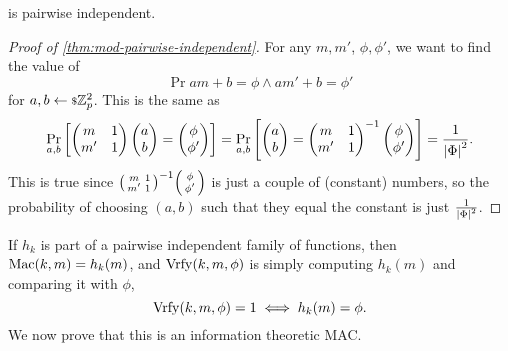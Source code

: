 \begin{theorem} \label{thm:mod-pairwise-independent}
	 is pairwise independent.
\end{theorem}

\begin{proof}[Proof of \cref{thm:mod-pairwise-independent}]
	For any $m, m'$, $\phi, \phi'$, we want to find the value of
	\begin{equation*}
		\Pr{a m + b = \phi \land a m' + b = \phi'}
	\end{equation*}
	for $a,b \rand{\Integers^2_p}$.
	This is the same as
	\begin{equation*}
		\Pr[a,b]{
			\begin{pmatrix}
				m & 1 \\
				m' & 1
			\end{pmatrix}
			\begin{pmatrix}
			a \\ b
			\end{pmatrix}
			=
			\begin{pmatrix}
			\phi \\ \phi'
			\end{pmatrix}
		}
		=
		\Pr[a,b]{
			\begin{pmatrix}
			a \\ b
			\end{pmatrix}
			=
			{
			\begin{pmatrix}
				m & 1 \\
				m' & 1
			\end{pmatrix}
			}^{-1}
			\begin{pmatrix}
			\phi \\ \phi'
			\end{pmatrix}
		}
		=
		\frac{1}{\abs{\GenericAuthSpace}^2}.
	\end{equation*}
	This is true since 
	${\begin{psmallmatrix}
		m & 1 \\
		m' & 1
	\end{psmallmatrix}
	}^{-1}
	\begin{psmallmatrix}
	\phi \\ \phi'
	\end{psmallmatrix}$
	is just a couple of (constant) numbers, so the probability of choosing $(a,b)$ such that they equal the constant is just $\frac{1}{\abs{\GenericAuthSpace}^2}$.
\end{proof}

If $h_k$ is part of a pairwise independent family of functions, then $\GenericMac(k,m) = h_k(m)$, and $\GenericVrfy(k,m,\phi)$ is simply computing $h_k(m)$ and comparing it with $\phi$, \ie
\begin{equation*}
	\GenericVrfy(k,m,\phi) = 1 \iff h_k(m) = \phi.
\end{equation*}
We now prove that this is an information theoretic \ac{MAC}.

